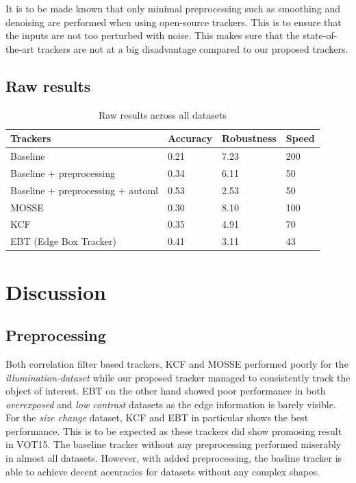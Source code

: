 \documentclass[fypca]{socreport}
\begin{document}
It is to be made known that only minimal preprocessing such as smoothing and
denoising are performed when using open-source trackers. This is to ensure that
the inputs are not too perturbed with noise. This makes sure that the
state-of-the-art trackers are not at a big disadvantage compared to our proposed trackers. 

\subsection{Raw results}

\begin{table}[H]
\centering
\begin{tabular}{|l|l|l|l|}
\hline
Trackers                           & Accuracy & Robustness & Speed \\ \hline
Baseline                           & 0.21     & 7.23       & 200   \\ \hline
Baseline + preprocessing           & 0.34     & 6.11       & 50    \\ \hline
Baseline + preprocessing +  automl & 0.53     & 2.53       & 50    \\ \hline
MOSSE                              & 0.30     & 8.10       & 100   \\ \hline
KCF                                & 0.35     & 4.91       & 70    \\ \hline
EBT (Edge Box Tracker)             & 0.41     & 3.11       & 43    \\ \hline
\end{tabular}
\caption{Raw results across all datasets}
\label{table:raw_results}
\end{table}

\section{Discussion}
  
\subsection{Preprocessing}

Both correlation filter based trackers, KCF and MOSSE performed poorly for the
\textit{illumination-dataset} while our proposed tracker managed to consistently
track the object of interest. EBT on the other hand showed poor performance in
both \textit{overexposed} and \textit{low contrast} datasets as the edge
information is barely visible. For the \textit{size change} dataset, KCF and EBT in
particular shows the best performance. This is to be expected as these trackers
did show promosing result in VOT15. The baseline tracker without any
preprocessing performed miserably in almost all datasets. However, with added
preprocessing, the basline tracker is able to achieve decent accuracies for
datasets without any complex shapes.
\end{document}
